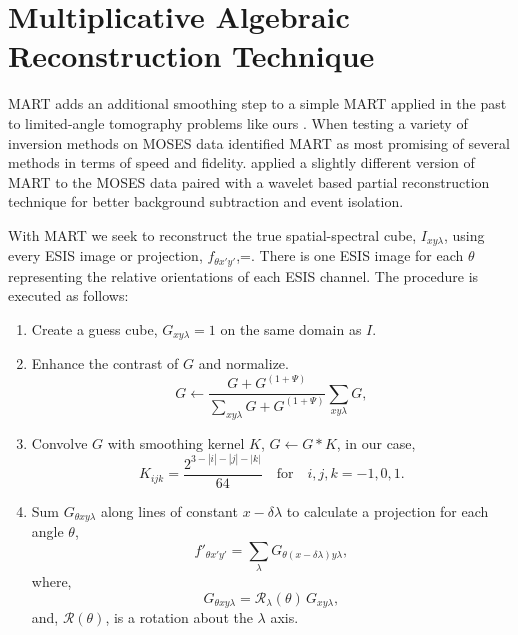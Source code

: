 {\section{Multiplicative Algebraic Reconstruction Technique}\label{MART}
	MART adds an additional smoothing step to a simple MART applied in the past to limited-angle tomography problems like ours \citep{Okamoto1991,Verhoeven1993}.
	When testing a variety of inversion methods on MOSES data \citet{FoxPhD} identified MART as most promising of several methods in terms of speed and fidelity.
	\citet{RustPhD} applied a slightly different version of MART to the MOSES data paired with a wavelet based partial reconstruction technique for better background subtraction and event isolation.
	
	With MART we seek to reconstruct the true spatial-spectral cube, $I_{xy\lambda}$, using every ESIS image or projection, $f_{\theta x'y'}$,=. There is one ESIS image for each $\theta$ representing the relative orientations of each ESIS channel. The procedure is executed as follows:
	\begin{enumerate}
		\item \label{step:guess} Create a guess cube, $G_{xy\lambda} = 1$ on the same domain as $I$. 
		\item \label{step:contrast} Enhance the contrast of $G$ and normalize. 
			\begin{equation}
				G \leftarrow \frac{G+G^{(1+\Psi)}}{\sum_{xy\lambda}G+G^{(1+\Psi)}}\sum_{xy\lambda}G, 
			\end{equation}
		
		\item \label{step:smooth} Convolve $G$ with smoothing kernel $K$, $G \leftarrow G * K$,
		in our case,
			\begin{equation}
			\label{eq:kernel}
				K_{ijk} = \frac{2^{3-|i|-|j|-|k|}}{64} \quad \text{for}\quad i,j,k = -1,0,1.
			\end{equation}
		
		\item \label{step:project} Sum $G_{\theta xy\lambda}$ along lines of constant $x-\delta\lambda$ to calculate a projection for each angle $\theta$,
			\begin{equation}
				f'_{\theta x'y'} = \sum_\lambda G_{\theta(x-\delta\lambda)y\lambda}, 
			\end{equation}
		where,
			\begin{equation}
				G_{\theta xy\lambda} = \mathcal{R}_\lambda(\theta)\,G_{xy\lambda},
			\end{equation} 
		and, $\mathcal{R}(\theta)$, is a rotation about the $\lambda$ axis. 	
		

\end{enumerate}}
